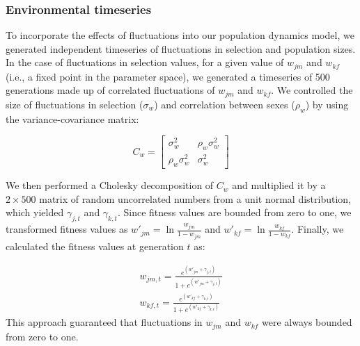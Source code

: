 \begin{refsection}
\subsubsection*{Environmental timeseries}

To incorporate the effects of fluctuations into our population dynamics model, we generated independent timeseries of fluctuations in selection and population sizes. In the case of fluctuations in selection values, for a given value of $w_{jm}$ and $w_{kf}$ (i.e., a fixed point in the parameter space), we generated a timeseries of 500 generations made up of correlated fluctuations of $w_{jm}$ and $w_{kf}$. We controlled the size of  fluctuations in selection ($\sigma_{w}$) and correlation between sexes ($\rho_{w}$) by  using the variance-covariance matrix:

\begin{equation}
C_{w} = \begin{bmatrix}
\sigma_{w}^{2} & \rho_{w} \sigma_{w}^{2} \\
\rho_{w} \sigma_{w}^{2} & \sigma_{w}^{2}
\end{bmatrix}
\label{covmat}
\end{equation}

We then performed a Cholesky decomposition of $C_{w}$ and multiplied it by a $2 \times 500$ matrix of random uncorrelated numbers from a unit normal distribution, which yielded  $\gamma_{j,t}$ and $\gamma_{k,t}$. Since fitness values are bounded from zero to one, we transformed fitness values as $w'_{jm} = \ln\frac{w_{jm}}{1-w_{jm}}$ and $w'_{kf} = \ln\frac{w_{kf}}{1-w_{kf}}$. Finally, we calculated the fitness values at generation $t$ as:

\begin{eqnarray}
  w_{jm,t}= \frac{e^{(w'_{jm}+ \gamma_{j,t})}}{1+ e^{(w'_{jm}+ \gamma_{j,t})}} \\
    w_{kf,t}= \frac{e^{(w'_{kf}+ \gamma_{k,t})}}{1+ e^{(w'_{kf}+ \gamma_{k,t})}}
    \label{logistic_w}
\end{eqnarray}
This approach guaranteed that fluctuations in $w_{jm}$ and $w_{kf}$ were always bounded from zero to one.


\end{refsection}
